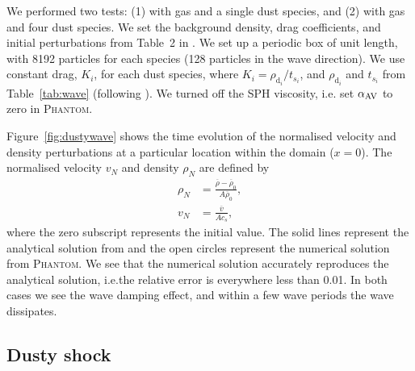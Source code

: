 \documentclass[fleqn,usenatbib]{mnras}
\newcommand{\dd}{\mathrm{d}}
\begin{document}
We performed two tests: (1) with gas and a single dust species, and (2) with gas
and four dust species. We set the background density, drag coefficients, and
initial perturbations from Table~2 in
\citet{Benitez-Llambay2019ApJS..241...25B}. We set up a periodic box of unit
length, with 8192 particles for each species (128 particles in the wave
direction). We use constant drag, \(K_i\), for each dust species, where \(K_i =
\rho_{\dd_i} / t_{s_i}\), and \(\rho_{\dd_i}\) and \(t_{s_i}\) from
Table~\ref{tab:wave} (following \citealt{Benitez-Llambay2019ApJS..241...25B}).
We turned off the SPH viscosity, i.e. set \(\alpha_{\rm AV}\) to zero in
\textsc{Phantom}.

Figure~\ref{fig:dustywave} shows the time evolution of the normalised velocity
and density perturbations at a particular location within the domain (\(x=0\)).
The normalised velocity \( v_N \) and density \( \rho_N \) are defined by
%
\begin{align}
   \rho_N &= \frac{\overline{\rho} - \overline{\rho}_0}{A \overline{\rho}_0}, \\
   v_N &= \frac{\overline{v}}{A c_s},
\end{align}
%
where the zero subscript represents the initial value. The solid lines represent
the analytical solution from \citet{Benitez-Llambay2019ApJS..241...25B} and the
open circles represent the numerical solution from \textsc{Phantom}. We see that
the numerical solution accurately reproduces the analytical solution, i.e.\@ the
relative error is everywhere less than 0.01. In both cases we see the wave
damping effect, and within a few wave periods the wave dissipates.

\subsection{Dusty shock}%
\label{subsec:shock}
\end{document}

